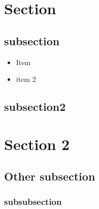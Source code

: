\titleRRITD %

\newpage

\maketitle
\thispagestyle{empty}
\tableofcontents

\section{Section}

\subsection{subsection}
\begin{itemize}
\item Item

\item item 2
\end{itemize}

\subsection{subsection2}

\section{Section 2}
\subsection{Other subsection}
\subsubsection{subsubsection}



